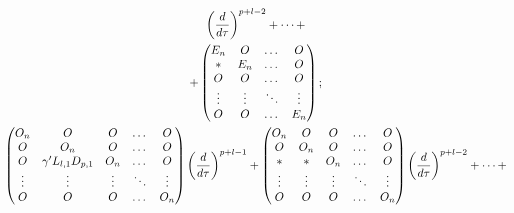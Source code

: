 \begin{pf}
\begin{gather}
\bigg(\frac{d}{d\tau}\bigg)^{p+l-2} + \dotsb + \notag \\


%


+


\begin{pmatrix}


E_n & O & \dotsc & O\\


\ast & E_n & \dotsc & O\\


O & O & \dotsc & O\\


\vdots & \vdots & \ddots & \vdots\\


O & O & \dotsc & E_n


\end{pmatrix}


; \notag \\


%


\begin{pmatrix}


O_n & O & O& \dotsc & O\\


O & O_n & O & \dotsc & O\\


O & \gamma'L_{l,1}D_{p,1} & O_n & \dotsc & O\\


\vdots & \vdots & \vdots & \ddots & \vdots\\


O & O & O &\dotsc & O_n


\end{pmatrix}


\bigg(\frac{d}{d\tau}\bigg)^{p+l-1}+ 


\begin{pmatrix}


O_n & O & O & \dotsc & O\\


O & O_n & O & \dotsc & O\\


\ast & * & O_n & \dotsc & O\\


\vdots & \vdots & \vdots & \ddots & \vdots\\


O & O & O &\dotsc & O_n


\end{pmatrix} 


\bigg(\frac{d}{d\tau}\bigg)^{p+l-2}+ \dotsb + \notag \\



\end{gather}
\end{pf}
